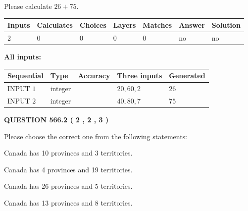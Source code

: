 \documentclass[12pt]{article}
\begin{document}
  
 
Please calculate $ %
26 +  %
75 $.
 
 
   
   
   
   
\noindent\begin{tabular}{|l|l|l|l|l|l|l|}
 \hline
Inputs & Calculates & Choices & Layers & Matches & Answer & Solution \\ \hline
 2  & 
 0  & 
 0
  & 
 0  & 
 0  & 
  no & 
  no 
  \\ \hline
 \end{tabular}
   
   
   
   
\noindent{}
   
   
   
   
\noindent\vspace{0.1in}\hspace{-0.08in} {\textbf{\Large{All inputs: }}}
   
   
  
  
\noindent\begin{tabular}{|l|l|l|l|l|}
\hline
 Sequential & Type & Accuracy & Three inputs & Generated \\ 
\hline
 
 
  INPUT $  1 $ & integer &  & $
 20
 , 
 60
 , 
 2
 $ & $ 26 $ 
 \\  \hline  
 
 
  INPUT $  2 $ & integer &  & $
 40
 , 
 80
 , 
 7
 $ & $ 75 $ 
 \\  \hline  
 \end{tabular}
   
   
  
\vspace{0.2in}
  
{\textbf{\Large{QUESTION
566.2 
 ( 2 , 2 , 3 )
}}}
  
  
Please choose the correct one from the following statements:
 
 
Canada has 10  provinces and 3 territories.
 
 
Canada has   4 provinces and  19 territories.
 
 
Canada has  26 provinces and  5 territories.
 
 
Canada has  13 provinces and  8 territories.
 
\end{document}
